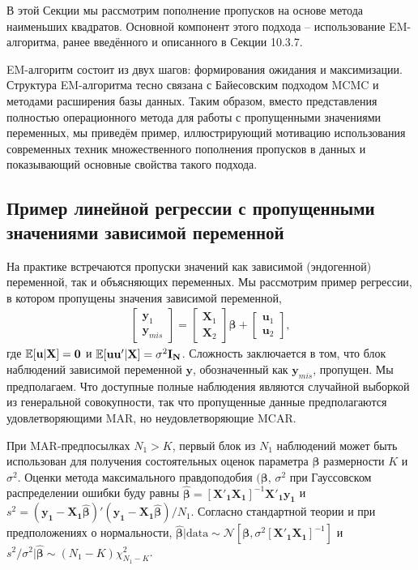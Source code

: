 В этой Секции мы рассмотрим пополнение пропусков на основе метода наименьших квадратов. Основной компонент этого подхода – использование EM-алгоритма, ранее введённого и описанного в Секции 10.3.7. 

EM-алгоритм состоит из двух шагов: формирования ожидания и максимизации. Структура EM-алгоритма тесно связана с Байесовским подходом MCMC и методами расширения базы данных. Таким образом, вместо представления полностью операционного метода для работы с пропущенными значениями переменных, мы приведём пример, иллюстрирующий мотивацию использования современных техник множественного пополнения пропусков в данных и показывающий основные свойства такого подхода.

\subsection{Пример линейной регрессии с пропущенными значениями зависимой переменной} 

На практике встречаются пропуски значений как зависимой (эндогенной) переменной, так и объясняющих переменных. Мы рассмотрим пример регрессии, в котором пропущены значения зависимой переменной,
\begin{align}
\begin{bmatrix}
\mathbf{y}_1 \\ \mathbf{y}_{mis} 
\end{bmatrix} 
= 
\begin{bmatrix}
\mathbf{X}_1 \\ \mathbf{X}_2 
\end{bmatrix} 
\mathbf{\beta}
+
\begin{bmatrix}
\mathbf{u}_1 \\ \mathbf{u}_2 
\end{bmatrix}
,
\end{align}
где $\mathbb{E}[\mathbf{u|X}]= \mathbf{0}$ и $\mathbb{E}[\mathbf{uu'|X}]= \sigma^2\mathbf{I_N}$. Сложность заключается в том, что блок наблюдений зависимой переменной $\mathbf{y}$, обозначенный как $\mathbf{y}_{mis}$, пропущен. Мы предполагаем. Что доступные полные наблюдения являются случайной выборкой из генеральной совокупности, так что пропущенные данные предполагаются удовлетворяющими MAR, но неудовлетворяющие MCAR.

При MAR-предпосылках $N_1>K$, первый блок из $N_1$ наблюдений может быть использован для получения состоятельных оценок  параметра $\mathbf{\beta}$ размерности $K$ и $\sigma^2$. Оценки метода максимального правдоподобия $(\mathbf{\beta}, \, \sigma^2$  при Гауссовском распределении ошибки буду равны $\widehat{\mathbf{\beta}}=[\mathbf{X'_1 X_1}]^{-1}\mathbf{X'_1 y_1}$ и $s^2=(\mathbf{y_1-X_1}\widehat{\mathbf{\beta}})'(\mathbf{y_1-X_1}\widehat{\mathbf{\beta}})/N_1$. Согласно стандартной теории и при предположениях о нормальности, $\widehat{\mathbf{\beta}}|\text{data} \sim \mathcal{N}[\mathbf{\beta}, \sigma^2[\mathbf{X'_1 X_1}]^{-1}]$ и $s^2 / \sigma^2 | \widehat{\mathbf{\beta}} \sim (N_1-K)\chi^2_{N_1-K}$.

